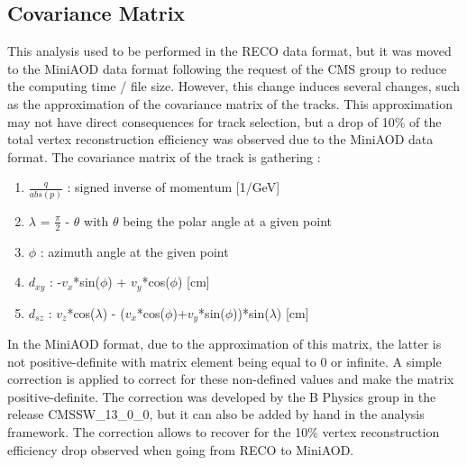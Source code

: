 \documentclass{cernatlasnote}
\begin{document}
\subsection{Covariance Matrix}
\label{APP: COVMAT}
This analysis used to be performed in the RECO data format, but it was moved to the MiniAOD data format following the request of the CMS group to reduce the computing time / file size. However, this change induces several changes, such as the approximation of the covariance matrix of the tracks. This approximation may not have direct consequences for track selection, but a drop of 10\% of the total vertex reconstruction efficiency was observed due to the MiniAOD data format. 
The covariance matrix of the track is gathering :
\begin{enumerate}
    \item  $\frac{q}{abs(p)}$ :  signed inverse of momentum [1/GeV] 
    \item  $\lambda$ = $\frac{\pi}{2}$ - $\theta$ with $\theta$ being the polar angle at a given point 
    \item  $\phi$ : azimuth angle at the given point 
    \item  $d_{xy}$ : -$v_x$*sin($\phi$) + $v_y$*cos($\phi$) [cm] 
    \item  $d_{sz}$ : $v_z$*cos($\lambda$) - ($v_x$*cos($\phi$)+$v_y$*sin($\phi$))*sin($\lambda$) [cm] 
\end{enumerate}
In the MiniAOD format, due to the approximation of this matrix, the latter is not positive-definite with matrix element being equal to 0 or infinite. A simple correction is applied to correct for these non-defined values and make the matrix positive-definite. The correction was developed by the B Physics group \cite{COVMAT} in the release CMSSW\_13\_0\_0, but it can also be added by hand in the analysis framework. The correction allows to recover for the 10\% vertex reconstruction efficiency drop observed when going from RECO to MiniAOD.

\pagebreak
\end{document}
